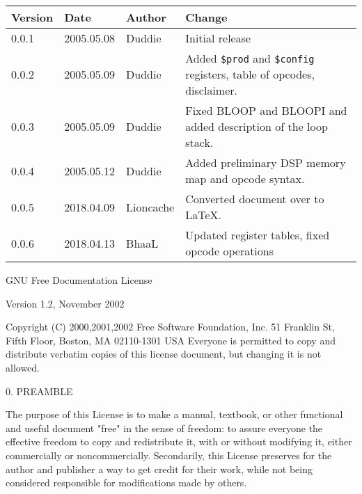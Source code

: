 \documentclass[oneside,english,a4paper,10pt,oneside,openany,final]{memoir}
\newcommand{\Register}[1]{\texttt{#1}}
\begin{document}
\begin{table}[htb]
\centering
\begin{tabular}{|l|l|l|l|}
\hline
\textbf{Version} & \textbf{Date} & \textbf{Author} & \textbf{Change}                                                                          \\ \hline
0.0.1            & 2005.05.08    & Duddie          & Initial release                                                                          \\ \hline
0.0.2            & 2005.05.09    & Duddie          & Added \Register{\$prod} and \Register{\$config} registers, table of opcodes, disclaimer. \\ \hline
0.0.3            & 2005.05.09    & Duddie          & Fixed BLOOP and BLOOPI and added description of the loop stack.                          \\ \hline
0.0.4            & 2005.05.12    & Duddie          & Added preliminary DSP memory map and opcode syntax.                                      \\ \hline
0.0.5            & 2018.04.09    & Lioncache       & Converted document over to LaTeX.                                                        \\ \hline
0.0.6            & 2018.04.13    & BhaaL           & Updated register tables, fixed opcode operations                                         \\ \hline
\end{tabular}
\end{table}

\pagebreak{}


GNU Free Documentation License

Version 1.2, November 2002

  Copyright (C) 2000,2001,2002  Free Software Foundation, Inc.
  51 Franklin St, Fifth Floor, Boston, MA  02110-1301  USA
  Everyone is permitted to copy and distribute verbatim copies
  of this license document, but changing it is not allowed.

0. PREAMBLE

The purpose of this License is to make a manual, textbook, or other functional and useful document "free" in the sense of freedom: to assure everyone the effective freedom to copy and redistribute it, with or without modifying it, either commercially or noncommercially. Secondarily, this License preserves for the author and publisher a way to get credit for their work, while not being considered responsible for modifications made by others.
\end{document}
